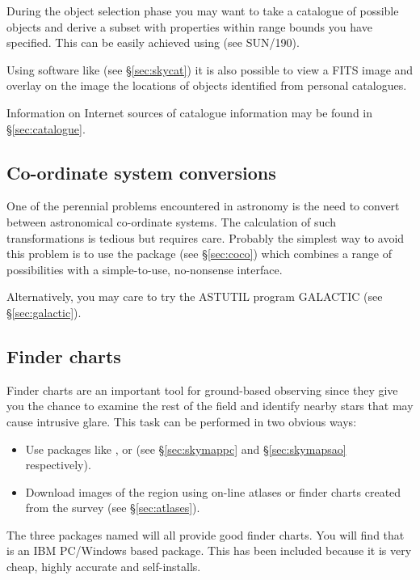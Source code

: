 During the object selection phase you may want to take a catalogue of possible
objects and derive a subset with properties within range bounds you
have specified. This can be easily achieved using {\CURSAref} (see
SUN/190).

Using software like {\SKYCATref} (see \S{\ref{sec:skycat}}) 
it is also possible to view a FITS image 
and overlay on the image the locations of objects identified from personal 
catalogues.  

Information on Internet sources of catalogue information may be found in \S{\ref{sec:catalogue}}.

\subsection{Co-ordinate system conversions} 
\label{sec:cords}

One of the perennial problems encountered in astronomy is the need to convert 
between astronomical co-ordinate systems. The calculation of such transformations is tedious but
requires care. Probably the simplest way to avoid this problem is to use the 
{\COCOref} package (see \S{\ref{sec:coco}}) which combines 
a range of possibilities with a simple-to-use, no-nonsense interface.

Alternatively, you may care to try the ASTUTIL program GALACTIC (see \S{\ref{sec:galactic}}).


\subsection{Finder charts} 
\label{sec:finderc}

Finder charts are an important tool for ground-based observing since
they give you the chance to examine the rest of the field and 
identify nearby stars that may cause intrusive glare. This task can be performed
in two obvious ways:

\begin{itemize}
\item Use packages like {\CHARTref}, 
{\SKYMAPPCref} or {\SKYMAPUNIXref} (see \S{\ref{sec:skymappc}} and \S{\ref{sec:skymapsao}} respectively).

\item Download images of the region using on-line atlases 
or finder charts created from the {\APMref} survey (see \S{\ref{sec:atlases}}). 
\end{itemize}

The three packages named will all provide good finder charts.
You will find that {\SKYMAPPCref} is an IBM PC/Windows based package.
This has been included because it is very cheap, highly accurate and 
self-installs. 

